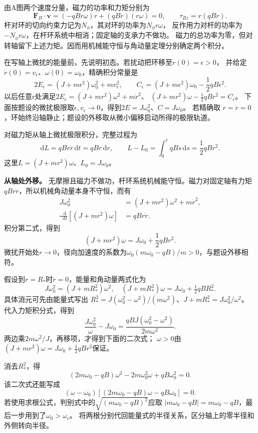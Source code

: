\documentclass[UTF8,fontset=fandol,a4paper,11pt]{ctexart}
\newcommand{\dd}{\mathop{}\!\mathrm{d}}
\begin{document}
由A图两个速度分量，磁力的功率和力矩分别为
\[
\boldsymbol F_B\cdot\boldsymbol v
=(-qBr\omega)\dot r+(qB\dot r)(r\omega)=0,\qquad
\tau_{Bz}=r(qB\dot r).
\]
杆对环的切向约束力记为$N_\phi$，其对环的功率为$N_\phi r\omega$，
反作用力对杆的功率为$-N_\phi r\omega$，在杆环系统中相消；固定轴的支承力不做功。
磁力的总功率为零，但对转轴留下上述力矩。因而用机械能守恒与角动量定理分别确定两个积分。

在写轴上微扰的能量前，先说明初态。若扰动把环移至$r(0)=\epsilon>0$，
并给定$\dot r(0)=v_\epsilon$、$\omega(0)=\omega_0$，精确积分常量是
\[
2E_\epsilon=(J+m\epsilon^2)\omega_0^2+mv_\epsilon^2,\qquad
C_\epsilon=(J+m\epsilon^2)\omega_0-\frac12qB\epsilon^2.
\]
以后任意r处满足$2E_\epsilon=(J+mr^2)\omega^2+m\dot r^2$、
$(J+mr^2)\omega-\tfrac12qBr^2=C_\epsilon$。
下面按题设的微扰极限取$\epsilon,v_\epsilon\to0$，得到$2E=J\omega_0^2$、$C=J\omega_0$。
若精确取 $r=\dot r=0$，环始终沿轴静止；题设的外移取从微小偏移启动所得的极限轨道。

对磁力矩从轴上微扰极限积分，完整过程为
\[
\mathrm dL=qBr\dot r\,\mathrm dt=qBr\,\mathrm dr,\qquad
L-L_0=\int_0^r qBs\,\mathrm ds=\frac12qBr^2.
\]
这里$L=(J+mr^2)\omega$、$L_0=J\omega_0$。

\textbf{从轴处外移。} 无摩擦且磁力不做功，杆环系统机械能守恒。磁力对固定轴有力矩$qB r\dot r$，所以机械角动量本身不守恒，而有
\begin{align*}
 J\omega_0^2&=(J+mr^2)\omega^2+m\dot r^2,\\
 \frac{\dd}{\dd t}[(J+mr^2)\omega]&=qBr\dot r.
\end{align*}
积分第二式，得到
\[
 (J+mr^2)\omega=J\omega_0+\frac12qBr^2.
\]
微扰开始处$r\to0$，径向加速度的系数为$\omega_0(m\omega_0-qB)/m>0$，与题设外移相符。

假设到$r=R_*$时$\dot r=0$，能量和角动量两式化为
\[
 J\omega_0^2=(J+mR_*^2)\omega^2,\quad
 (J+mR_*^2)\omega=J\omega_0+\tfrac12qBR_*^2.
\]
具体消元可先由能量式写出
$R_*^2=J(\omega_0^2-\omega^2)/(m\omega^2)$、$J+mR_*^2=J\omega_0^2/\omega^2$。
代入力矩积分式，得到
\[
\frac{J\omega_0^2}{\omega}-J\omega_0
=\frac{qBJ(\omega_0^2-\omega^2)}{2m\omega^2}.
\]
两边乘$2m\omega^2/J$，再移项，才得到下面的二次式；
$\omega>0$由$(J+mr^2)\omega=J\omega_0+\tfrac12qBr^2$保证。

消去$R_*^2$，得
\[
 (2m\omega_0-qB)\omega^2-2m\omega_0^2\omega+qB\omega_0^2=0.
\]
该二次式还能写成
\[
(\omega-\omega_0)
[(2m\omega_0-qB)\omega-qB\omega_0]=0.
\]
若使用求根公式，判别式中的$\sqrt{(m\omega_0-qB)^2}$应取
$|m\omega_0-qB|=m\omega_0-qB$，最后一步用到了$\omega_0>\omega_c$。
将两根分别代回能量式的半径关系，区分轴上的零半径和外侧转向半径。
\end{document}
